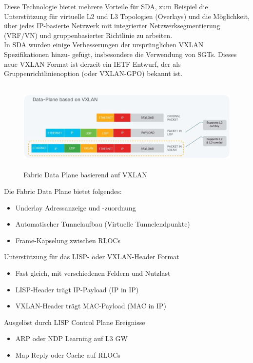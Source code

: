 Diese Technologie bietet mehrere Vorteile für SDA, zum Beispiel die Unterstützung für virtuelle L2 und L3 Topologien (Overlays) und die Möglichkeit, über jedes IP-basierte Netzwerk mit integrierter Netzwerksegmentierung (VRF/VN) und gruppenbasierter Richtlinie zu arbeiten. \\ 

In SDA wurden einige Verbesserungen der ursprünglichen VXLAN Spezifikationen hinzu- gefügt, insbesondere die Verwendung von SGTs. Dieses neue VXLAN Format ist derzeit ein IETF Entwurf, der als Gruppenrichtlinienoption (oder VXLAN-GPO) bekannt ist.

\begin{figure}[H]
	\centering
	\includegraphics[height=4.5cm]{img/vxlan-encapsulation.jpg}
	\caption{Fabric Data Plane basierend auf VXLAN \cite{sda-whitepaper}}
	\label{fig:Fabric Data Plane basierend auf VXLAN}
\end{figure}

Die Fabric Data Plane bietet folgendes:
\begin{itemize}
	\item Underlay Adressanzeige und -zuordnung
	\item Automatischer Tunnelaufbau (Virtuelle Tunnelendpunkte)
	\item Frame-Kapselung zwischen RLOCs
\end{itemize}

Unterstützung für das LISP- oder VXLAN-Header Format
\begin{itemize}
	\item Fast gleich, mit verschiedenen Feldern und Nutzlast
	\item LISP-Header trägt IP-Payload (IP in IP)
	\item VXLAN-Header trägt MAC-Payload (MAC in IP)
\end{itemize}

Ausgelöst durch LISP Control Plane Ereignisse
\begin{itemize}
	\item ARP oder NDP Learning auf L3 GW
	\item Map Reply oder Cache auf RLOCs
\end{itemize}

